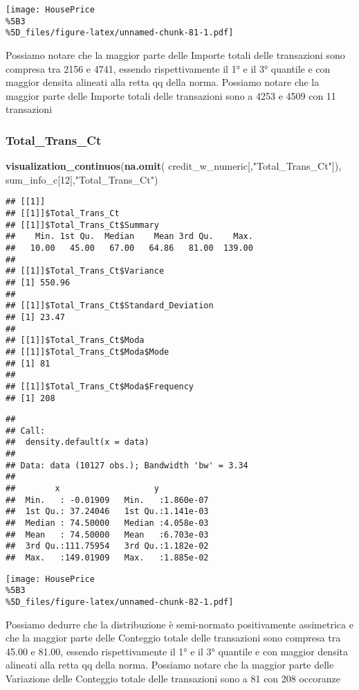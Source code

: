 \documentclass[
]{article}
\newenvironment{Shaded}{\begin{snugshade}}{\end{snugshade}}
\newcommand{\DecValTok}[1]{\textcolor[rgb]{0.00,0.00,0.81}{#1}}
\newcommand{\FunctionTok}[1]{\textcolor[rgb]{0.13,0.29,0.53}{\textbf{#1}}}
\newcommand{\NormalTok}[1]{#1}
\newcommand{\StringTok}[1]{\textcolor[rgb]{0.31,0.60,0.02}{#1}}
\begin{document}
\texttt{[image: HousePrice\\\%5B3\\\%5D\_files/figure-latex/unnamed-chunk-81-1.pdf]}

Possiamo notare che la maggior parte delle Importe totali delle
transazioni sono compresa tra 2156 e 4741, essendo rispettivamente il 1°
e il 3° quantile e con maggior densita alineati alla retta qq della
norma. Possiamo notare che la maggior parte delle Importe totali delle
transazioni sono a 4253 e 4509 con 11 transazioni

\subsubsection{Total\_Trans\_Ct}\label{total_trans_ct}

\begin{Shaded}
\begin{Highlighting}[]
\FunctionTok{visualization\_continuos}\NormalTok{(}\FunctionTok{na.omit}\NormalTok{(}
\NormalTok{  credit\_w\_numeric[,}\StringTok{"Total\_Trans\_Ct"}\NormalTok{]), sum\_info\_c[}\DecValTok{12}\NormalTok{],}\StringTok{"Total\_Trans\_Ct"}\NormalTok{)}
\end{Highlighting}
\end{Shaded}

\begin{verbatim}
## [[1]]
## [[1]]$Total_Trans_Ct
## [[1]]$Total_Trans_Ct$Summary
##    Min. 1st Qu.  Median    Mean 3rd Qu.    Max. 
##   10.00   45.00   67.00   64.86   81.00  139.00 
## 
## [[1]]$Total_Trans_Ct$Variance
## [1] 550.96
## 
## [[1]]$Total_Trans_Ct$Standard_Deviation
## [1] 23.47
## 
## [[1]]$Total_Trans_Ct$Moda
## [[1]]$Total_Trans_Ct$Moda$Mode
## [1] 81
## 
## [[1]]$Total_Trans_Ct$Moda$Frequency
## [1] 208
\end{verbatim}

\begin{verbatim}
## 
## Call:
##  density.default(x = data)
## 
## Data: data (10127 obs.); Bandwidth 'bw' = 3.34
## 
##        x                   y            
##  Min.   : -0.01909   Min.   :1.860e-07  
##  1st Qu.: 37.24046   1st Qu.:1.141e-03  
##  Median : 74.50000   Median :4.058e-03  
##  Mean   : 74.50000   Mean   :6.703e-03  
##  3rd Qu.:111.75954   3rd Qu.:1.182e-02  
##  Max.   :149.01909   Max.   :1.885e-02
\end{verbatim}

\texttt{[image: HousePrice\\\%5B3\\\%5D\_files/figure-latex/unnamed-chunk-82-1.pdf]}

Possiamo dedurre che la distribuzione è semi-normato positivamente
assimetrica e che la maggior parte delle Conteggio totale delle
transazioni sono compresa tra 45.00 e 81.00, essendo rispettivamente il
1° e il 3° quantile e con maggior densita alineati alla retta qq della
norma. Possiamo notare che la maggior parte delle Variazione delle
Conteggio totale delle transazioni sono a 81 con 208 occoranze
\end{document}
